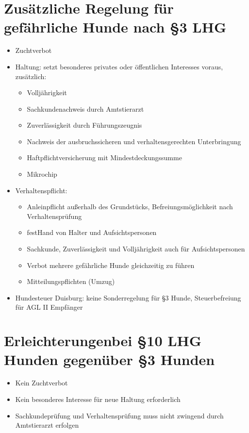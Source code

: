 \section{Zusätzliche Regelung für gefährliche Hunde nach §3 LHG}
    \begin{itemize}
        \item Zuchtverbot
        \item Haltung: setzt besonderes privates oder öffentlichen Interesses voraus, zusätzlich:
        \begin{itemize}
            \item Volljährigkeit
            \item Sachkundenachweis durch Amtstierarzt
            \item Zuverlässigkeit durch Führungszeugnis
            \item Nachweis der ausbruchssicheren und verhaltensgerechten Unterbringung
            \item Haftpflichtversicherung mit Mindestdeckungssumme
            \item Mikrochip
        \end{itemize}
        \item Verhaltenspflicht:
        \begin{itemize}
            \item Anleinpflicht außerhalb des Grundstücks, Befreiungsmöglichkeit nach Verhaltensprüfung
            \item \glqq fest\grqq Hand von Halter und Aufsichtspersonen
            \item Sachkunde, Zuverlässigkeit und Volljährigkeit auch für Aufsichtspersonen
            \item Verbot mehrere gefährliche Hunde gleichzeitig zu führen
            \item Mitteilungspflichten (Umzug)
        \end{itemize}
        \item Hundesteuer Duisburg: keine Sonderregelung für §3 Hunde, Steuerbefreiung für AGL II Empfänger
    \end{itemize}

 \section{\glqq Erleichterungen\grqq bei §10 LHG Hunden gegenüber §3 Hunden}
    \begin{itemize}
           \item Kein Zuchtverbot
           \item Kein besonderes Interesse für neue Haltung erforderlich
           \item Sachkundeprüfung und Verhaltensprüfung muss nicht zwingend durch Amtstierarzt erfolgen
       \end{itemize}


